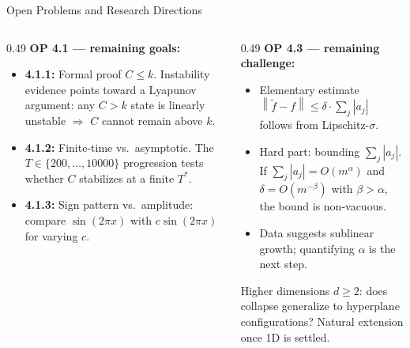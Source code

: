 \documentclass[aspectratio=169, 10pt]{beamer}
\newcommand{\ftilde}{\tilde{f}}
\newcommand{\norm}[1]{\left\|#1\right\|}
\begin{document}
\begin{frame}{Open Problems and Research Directions}
  \begin{columns}[T]
    \begin{column}{0.49\textwidth}
      \small
      \textbf{OP 4.1 — remaining goals:}
      \begin{itemize}
        \item \textbf{4.1.1:} Formal proof $C \leq k$.
              Instability evidence points toward a
              Lyapunov argument: any $C>k$ state is
              linearly unstable $\Rightarrow$ $C$
              cannot remain above $k$.
        \item \textbf{4.1.2:} Finite-time vs.\
              asymptotic. The $T\in\{200,\ldots,10000\}$
              progression tests whether $C$ stabilizes
              at a finite $T^\ast$.
        \item \textbf{4.1.3:} Sign pattern vs.\
              amplitude: compare $\sin(2\pi x)$ with
              $c\sin(2\pi x)$ for varying $c$.
      \end{itemize}
    \end{column}
    \begin{column}{0.49\textwidth}
      \small
      \textbf{OP 4.3 — remaining challenge:}
      \begin{itemize}
        \item Elementary estimate
              $\norm{\ftilde-f}\leq\delta\cdot\sum_j|a_j|$
              follows from Lipschitz-$\sigma$.
        \item Hard part: bounding $\sum_j|a_j|$.
              If $\sum_j|a_j|=O(m^\alpha)$ and
              $\delta=O(m^{-\beta})$ with $\beta>\alpha$,
              the bound is non-vacuous.
        \item Data suggests sublinear growth;
              quantifying $\alpha$ is the next step.
      \end{itemize}
      \vspace{0.4em}
      \begin{tcolorbox}[slideboxA, title={OP 4.2 (future)}]
        \small
        Higher dimensions $d\geq 2$: does collapse
        generalize to hyperplane configurations?
        Natural extension once 1D is settled.
      \end{tcolorbox}
    \end{column}
  \end{columns}
\end{frame}
\end{document}

